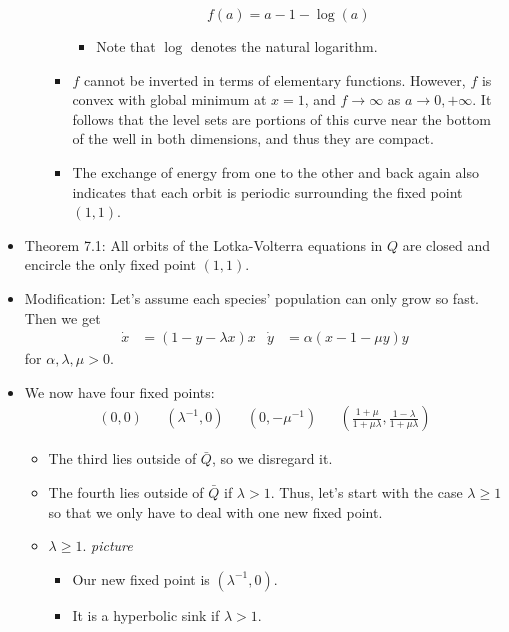 \documentclass[../notes.tex]{subfiles}
\begin{document}
\begin{itemize}
\begin{itemize}
\begin{itemize}
\begin{equation*}
                f(a) = a-1-\log(a)
            \end{equation*}
            \begin{itemize}
                \item Note that $\log$ denotes the natural logarithm.
            \end{itemize}
            \item $f$ cannot be inverted in terms of elementary functions. However, $f$ is convex with global minimum at $x=1$, and $f\to\infty$ as $a\to 0,+\infty$. It follows that the level sets are portions of this curve near the bottom of the well in both dimensions, and thus they are compact.
            \item The exchange of energy from one to the other and back again also indicates that each orbit is periodic surrounding the fixed point $(1,1)$.
        \end{itemize}
    \end{itemize}
    \item Theorem 7.1: All orbits of the Lotka-Volterra equations in $Q$ are closed and encircle the only fixed point $(1,1)$.
    \item Modification: Let's assume each species' population can only grow so fast. Then we get
    \begin{align*}
        \dot{x} &= (1-y-\lambda x)x&
        \dot{y} &= \alpha(x-1-\mu y)y
    \end{align*}
    for $\alpha,\lambda,\mu>0$.
    \item We now have four fixed points:
    \begin{align*}
        (0,0)&&
        (\lambda^{-1},0)&&
        (0,-\mu^{-1})&&
        \left( \frac{1+\mu}{1+\mu\lambda},\frac{1-\lambda}{1+\mu\lambda} \right)
    \end{align*}
    \begin{itemize}
        \item The third lies outside of $\bar{Q}$, so we disregard it.
        \item The fourth lies outside of $\bar{Q}$ if $\lambda>1$. Thus, let's start with the case $\lambda\geq 1$ so that we only have to deal with one new fixed point.
        \item $\lambda\geq 1$.
        \emph{picture}
        \begin{itemize}
            \item Our new fixed point is $(\lambda^{-1},0)$.
            \item It is a hyperbolic sink if $\lambda>1$.

\end{itemize}
\end{itemize}
\end{itemize}
\end{document}
